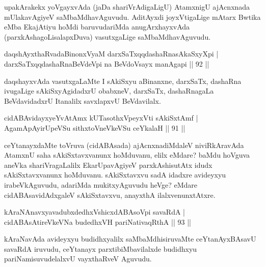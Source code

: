 \begin{artha}
upakArakekx yoVgayxvAda (jaDa shariVrAdigaLigU) AtamxnigU ajAcnxnada mUlakavAgiyeV saMbaMdhavAguvudu. AditAyxdi joyxVtigaLige mAtarx Bwtika eMba EkajAtiyu hoMdi baruvudariMda anugArxhayxvAda (parxkAshagoLisalapxDuva) vasutxgaLige saMbaMdhavAguvudu.
\end{artha}


\begin{shl}
daqshAyxthaRvadaBinonxV\s yaM darxSaTxqqdashaRnasAkaSxyXpi | \\
darxSaTxqqdashaRnaBeVdeV\s pi na BeVdoV\s sayx manAgapi \hfill||  92 ||  
\end{shl}

\begin{artha}
daqshayxvAda vasutxgaLaMte I sAkiSxyu aBinanxne, darxSaTx, dashaRna ivugaLige sAkiSxyAgidadxrU obabxneV, darxSaTx, dashaRnagaLa BeVdavidadxrU Itanalilx savxlapxvU BeVdavilalx.
\end{artha}


\begin{shl}
cidABAvidayxyeYvA\s \s tAmx kUTasothxV\s peyxVti sAkiSxtAmf | \\
AgamApAyirUpeVSu sithxtoV\s neVkeVSu ceYkalaH \hfill||  91 ||  
\end{shl}

\begin{artha}
ceYtanayxdaMte toVruva (cidABAsada) ajAcnxnadiMdaleV niviRkAravAda AtamxnU saha sAkiSxtavxvanunx hoMduvanu, elilx eMdare? baMdu hoVguva aneVka shariVragaLalilx EkarUpavAgiyeV parxkAshisutAtx idudx sAkiSxtavxvanunx hoMduvanu. sAkiSxtavxvu sadA idadxre avideyxyu irabeVkAguvudu, adariMda mukitxyAguvudu heVge? eMdare cidABAsavidAdxgaleV sAkiSxtavxvu, anayxthA ilalxvenunxtAtxre. 
\end{artha}

\begin{shl}
kAraNAnavxyavadubxdedhxVshicxdABAsoV\s pi savaRdA | \\
cidABAsAtireVkeVNa budedhxVH pariNativaqRthA \hfill||  93 ||  
\end{shl}

\begin{artha}
kAraNavAda avideyxyu budidhxyalilx saMbaMdhisiruvaMte ceYtanAyxBAsavU savaRdA iruvudu, ceYtanayx parxtibiMbavilalxde budidhxyu pariNamisuvudelalxvU vayxthaRveV Aguvudu.
\end{artha}

